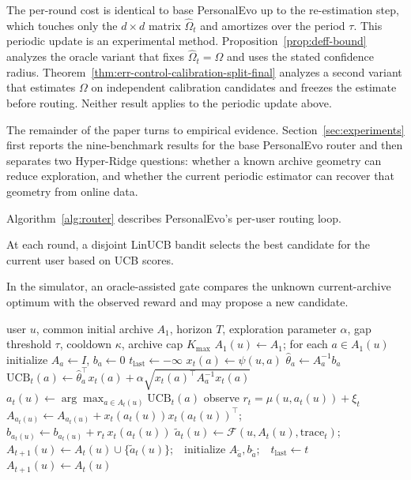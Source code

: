 \documentclass{article} %
\begin{document}
The per-round cost is identical to base PersonalEvo up to the
re-estimation step, which touches only the $d \times d$ matrix
$\widehat{\Omega}_t$ and amortizes over the period $\tau$. This periodic update
is an experimental method. Proposition~\ref{prop:deff-bound} analyzes the
oracle variant that fixes $\widehat\Omega_t=\Omega$ and uses the stated
confidence radius. Theorem~\ref{thm:err-control-calibration-split-final}
analyzes a second variant that estimates $\Omega$ on independent calibration
candidates and freezes the estimate before routing. Neither result applies to
the periodic update above.

The remainder of the paper turns to empirical evidence. Section~\ref{sec:experiments}
first reports the nine-benchmark results for the base PersonalEvo router and
then separates two Hyper-Ridge questions: whether a known archive geometry can
reduce exploration, and whether the current periodic estimator can recover that
geometry from online data.


Algorithm~\ref{alg:router} describes PersonalEvo's per-user routing loop.

At each round, a disjoint LinUCB bandit selects the best candidate for the current user based on UCB scores.

In the simulator, an oracle-assisted gate compares the unknown current-archive optimum with the observed reward and may propose a new candidate.

\begin{algorithm}[t]
\caption{Per-user personalized routing over a growing archive.}
\label{alg:router}
\begin{algorithmic}[1]
\Require user $u$, common initial archive $A_1$, horizon $T$, exploration parameter $\alpha$, gap threshold $\tau$, cooldown $\kappa$, archive cap $K_{\max}$
\State $A_1(u) \gets A_1$; for each $a \in A_1(u)$ initialize $A_a \gets I$, $b_a \gets 0$
\State $t_{\mathrm{last}} \gets -\infty$
        \State $x_t(a) \gets \psi(u,a)$ 
        \State $\hat\theta_a \gets A_a^{-1} b_a$
        \State $\mathrm{UCB}_t(a) \gets \hat\theta_a^\top x_t(a) + \alpha \sqrt{x_t(a)^\top A_a^{-1} x_t(a)}$
    \EndFor
    \State $a_t(u) \gets \arg\max_{a \in A_t(u)} \mathrm{UCB}_t(a)$
    \State observe $r_t = \mu(u, a_t(u)) + \xi_t$
    \State $A_{a_t(u)} \gets A_{a_t(u)} + x_t(a_t(u)) x_t(a_t(u))^\top$;\quad $b_{a_t(u)} \gets b_{a_t(u)} + r_t \, x_t(a_t(u))$
     
        \State $\tilde a_t(u) \gets \mathcal{F}(u, A_t(u), \mathrm{trace}_t)$;\ \ $A_{t+1}(u) \gets A_t(u) \cup \{\tilde a_t(u)\}$;\ \ initialize $A_{\tilde a}, b_{\tilde a}$;\ \ $t_{\mathrm{last}} \gets t$
    \Else
        \State $A_{t+1}(u) \gets A_t(u)$
    \EndIf
\EndFor
\end{algorithmic}
\end{algorithm}
\end{document}
